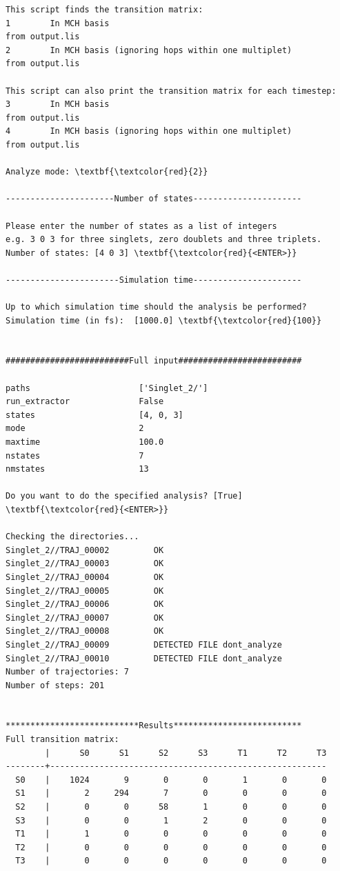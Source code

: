 \documentclass[a4paper,11pt,DIV=15,openany]{scrbook}
\begin{document}
\begin{oframed}
\begin{Verbatim}[commandchars=\\\{\}]
This script finds the transition matrix:
1        In MCH basis                                                    from output.lis
2        In MCH basis (ignoring hops within one multiplet)               from output.lis

This script can also print the transition matrix for each timestep:
3        In MCH basis                                                    from output.lis
4        In MCH basis (ignoring hops within one multiplet)               from output.lis

Analyze mode: \textbf{\textcolor{red}{2}}

----------------------Number of states----------------------

Please enter the number of states as a list of integers
e.g. 3 0 3 for three singlets, zero doublets and three triplets.
Number of states: [4 0 3] \textbf{\textcolor{red}{<ENTER>}}

-----------------------Simulation time----------------------

Up to which simulation time should the analysis be performed?
Simulation time (in fs):  [1000.0] \textbf{\textcolor{red}{100}}


#########################Full input#########################

paths                      ['Singlet_2/']
run_extractor              False
states                     [4, 0, 3]
mode                       2
maxtime                    100.0
nstates                    7
nmstates                   13

Do you want to do the specified analysis? [True] \textbf{\textcolor{red}{<ENTER>}}

Checking the directories...
Singlet_2//TRAJ_00002         OK
Singlet_2//TRAJ_00003         OK
Singlet_2//TRAJ_00004         OK
Singlet_2//TRAJ_00005         OK
Singlet_2//TRAJ_00006         OK
Singlet_2//TRAJ_00007         OK
Singlet_2//TRAJ_00008         OK
Singlet_2//TRAJ_00009         DETECTED FILE dont_analyze
Singlet_2//TRAJ_00010         DETECTED FILE dont_analyze
Number of trajectories: 7
Number of steps: 201


***************************Results**************************
Full transition matrix:
        |      S0      S1      S2      S3      T1      T2      T3
--------+--------------------------------------------------------
  S0    |    1024       9       0       0       1       0       0
  S1    |       2     294       7       0       0       0       0
  S2    |       0       0      58       1       0       0       0
  S3    |       0       0       1       2       0       0       0
  T1    |       1       0       0       0       0       0       0
  T2    |       0       0       0       0       0       0       0
  T3    |       0       0       0       0       0       0       0


\end{Verbatim}
\end{oframed}
\end{document}
